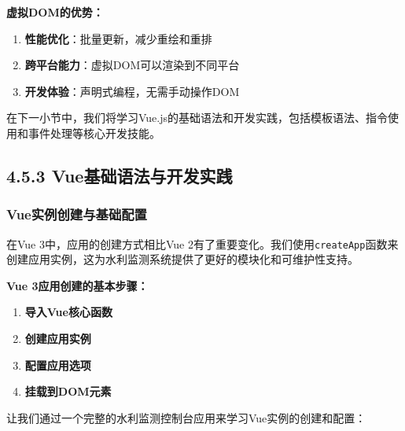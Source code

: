 \textbf{虚拟DOM的优势：}

\begin{enumerate}
\def\labelenumi{\arabic{enumi}.}
\tightlist
\item
  \textbf{性能优化}：批量更新，减少重绘和重排
\item
  \textbf{跨平台能力}：虚拟DOM可以渲染到不同平台
\item
  \textbf{开发体验}：声明式编程，无需手动操作DOM
\end{enumerate}

在下一小节中，我们将学习Vue.js的基础语法和开发实践，包括模板语法、指令使用和事件处理等核心开发技能。

\subsection{4.5.3 Vue基础语法与开发实践}\label{vueux57faux7840ux8bedux6cd5ux4e0eux5f00ux53d1ux5b9eux8df5}

\subsubsection{Vue实例创建与基础配置}\label{vueux5b9eux4f8bux521bux5efaux4e0eux57faux7840ux914dux7f6e}

在Vue 3中，应用的创建方式相比Vue 2有了重要变化。我们使用\texttt{createApp}函数来创建应用实例，这为水利监测系统提供了更好的模块化和可维护性支持。

\textbf{Vue 3应用创建的基本步骤：}

\begin{enumerate}
\def\labelenumi{\arabic{enumi}.}
\tightlist
\item
  \textbf{导入Vue核心函数}
\item
  \textbf{创建应用实例}
\item
  \textbf{配置应用选项}
\item
  \textbf{挂载到DOM元素}
\end{enumerate}

让我们通过一个完整的水利监测控制台应用来学习Vue实例的创建和配置：

